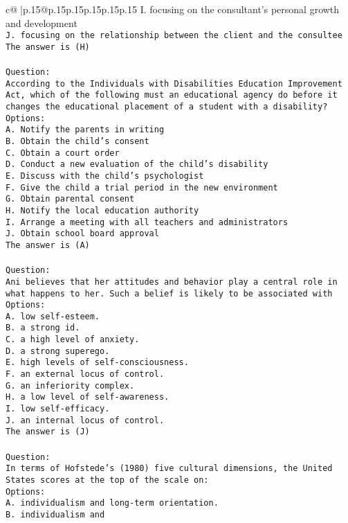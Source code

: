\documentclass{article}
\begin{document}
{\begin{supertabular}{c@{$\;$}|p{.15\linewidth}@{}p{.15\linewidth}p{.15\linewidth}p{.15\linewidth}p{.15\linewidth}p{.15\linewidth}}
{{{I. focusing on the consultant's personal growth and development\\ \tt J. focusing on the relationship between the client and the consultee\\ \tt The answer is (H)\\ \tt \\ \tt Question:\\ \tt According to the Individuals with Disabilities Education Improvement Act, which of the following must an educational agency do before it changes the educational placement of a student with a disability?\\ \tt Options:\\ \tt A. Notify the parents in writing\\ \tt B. Obtain the child's consent\\ \tt C. Obtain a court order\\ \tt D. Conduct a new evaluation of the child's disability\\ \tt E. Discuss with the child's psychologist\\ \tt F. Give the child a trial period in the new environment\\ \tt G. Obtain parental consent\\ \tt H. Notify the local education authority\\ \tt I. Arrange a meeting with all teachers and administrators\\ \tt J. Obtain school board approval\\ \tt The answer is (A)\\ \tt \\ \tt Question:\\ \tt Ani believes that her attitudes and behavior play a central role in what happens to her. Such a belief is likely to be associated with\\ \tt Options:\\ \tt A. low self-esteem.\\ \tt B. a strong id.\\ \tt C. a high level of anxiety.\\ \tt D. a strong superego.\\ \tt E. high levels of self-consciousness.\\ \tt F. an external locus of control.\\ \tt G. an inferiority complex.\\ \tt H. a low level of self-awareness.\\ \tt I. low self-efficacy.\\ \tt J. an internal locus of control.\\ \tt The answer is (J)\\ \tt \\ \tt Question:\\ \tt In terms of Hofstede’s (1980) five cultural dimensions, the United States scores at the top of the scale on:\\ \tt Options:\\ \tt A. individualism and long-term orientation.\\ \tt B. individualism and }}}
\end{supertabular}}
\end{document}
